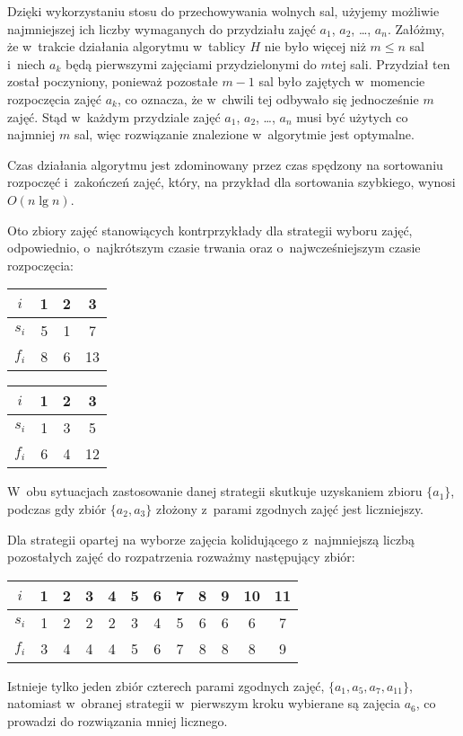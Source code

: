 Dzięki wykorzystaniu stosu do przechowywania wolnych sal, użyjemy możliwie najmniejszej ich liczby wymaganych do przydziału zajęć $a_1$, $a_2$, \dots, $a_n$.
Załóżmy, że w~trakcie działania algorytmu w~tablicy $H$ nie było więcej niż $m\le n$ sal i~niech $a_k$ będą pierwszymi zajęciami przydzielonymi do $m$\nbhyphen tej sali.
Przydział ten został poczyniony, ponieważ pozostałe $m-1$ sal było zajętych w~momencie rozpoczęcia zajęć $a_k$, co oznacza, że w~chwili tej odbywało się jednocześnie $m$ zajęć.
Stąd w~każdym przydziale zajęć $a_1$, $a_2$, \dots, $a_n$ musi być użytych co najmniej $m$ sal, więc rozwiązanie znalezione w~algorytmie jest optymalne.

Czas działania algorytmu jest zdominowany przez czas spędzony na sortowaniu rozpoczęć i~zakończeń zajęć, który, na przykład dla sortowania szybkiego, wynosi $O(n\lg n)$.

\exercise %

\noindent Oto zbiory zajęć stanowiących kontrprzykłady dla strategii wyboru zajęć, odpowiednio, o~najkrótszym czasie trwania oraz o~najwcześniejszym czasie rozpoczęcia:
\begin{center}
	\begin{tabular}{cccc}
		$i$ & 1 & 2 & 3 \\ \hline
		$s_i$ & 5 & 1 & 7 \\
		$f_i$ & 8 & 6 & 13
	\end{tabular}
	\hskip3cm
	\begin{tabular}{cccc}
		$i$ & 1 & 2 & 3 \\ \hline
		$s_i$ & 1 & 3 & 5 \\
		$f_i$ & 6 & 4 & 12
	\end{tabular}
\end{center}
W~obu sytuacjach zastosowanie danej strategii skutkuje uzyskaniem zbioru $\{a_1\}$, podczas gdy zbiór $\{a_2,a_3\}$ złożony z~parami zgodnych zajęć jest liczniejszy.

Dla strategii opartej na wyborze zajęcia kolidującego z~najmniejszą liczbą pozostałych zajęć do rozpatrzenia rozważmy następujący zbiór:
\begin{center}
	\begin{tabular}{cccccccccccc}
		$i$ & 1 & 2 & 3 & 4 & 5 & 6 & 7 & 8 & 9 & 10 & 11 \\ \hline
		$s_i$ & 1 & 2 & 2 & 2 & 3 & 4 & 5 & 6 & 6 & 6 & 7 \\
		$f_i$ & 3 & 4 & 4 & 4 & 5 & 6 & 7 & 8 & 8 & 8 & 9
	\end{tabular}
\end{center}
Istnieje tylko jeden zbiór czterech parami zgodnych zajęć, $\{a_1,a_5,a_7,a_{11}\}$, natomiast w~obranej strategii w~pierwszym kroku wybierane są zajęcia $a_6$, co prowadzi do rozwiązania mniej licznego.
